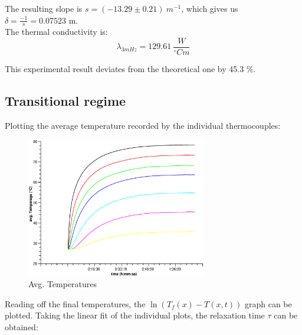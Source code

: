 \documentclass{scrartcl}
\begin{document}
The resulting slope is $s = (-13.29 \pm 0.21)  \ m^{-1}$, which gives us $\delta = \frac{-1}{s} = 0.07523$ m.\\

The thermal conductivity is:
\begin{equation*}
    \lambda_{3 mHz} = 129.61 \  \frac{W}{^{\circ}Cm}
\end{equation*}

This experimental result deviates from the theoretical one by 45.3 \%.
\newpage
\subsection{Transitional regime}
Plotting the average temperature recorded by the individual thermocouples:

\begin{figure}[!h]
    \centering
    \includegraphics[width=0.7\textwidth]{avgT.eps}
    \caption{Avg. Temperatures}
    \label{fig:my_label}
\end{figure}

Reading off the final temperatures, the $\ln(T_f(x)-T(x,t))$ graph can be plotted. Taking the linear fit of the individual plots, the relaxation time $\tau$ can be obtained:
\end{document}
